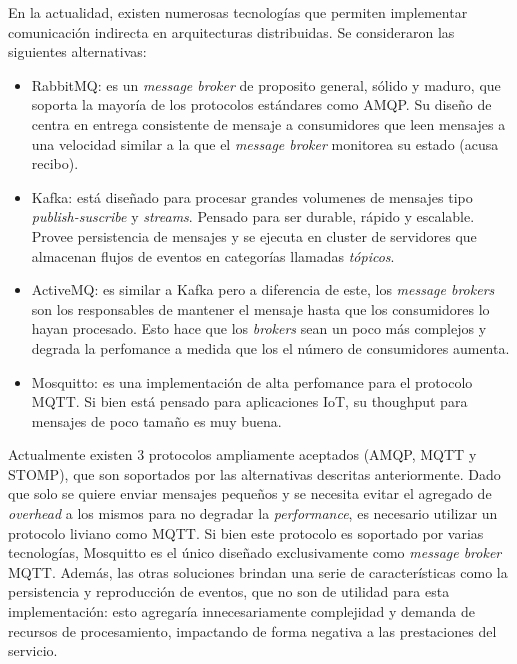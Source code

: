 \documentclass[a4paper,10pt, oneside]{article}
\begin{document}
En la actualidad, existen numerosas tecnologías que permiten implementar comunicación indirecta en arquitecturas distribuidas. Se consideraron las siguientes alternativas:

\begin{itemize}

	\item RabbitMQ: es un \textit{message broker} de proposito general, sólido y maduro, que soporta la mayoría de los protocolos estándares como AMQP. Su diseño de centra en entrega consistente de mensaje a consumidores que leen mensajes a una velocidad similar a la que el \textit{message broker} monitorea  su estado (acusa recibo).
	\item Kafka: está diseñado para procesar grandes volumenes de mensajes tipo \textit{publish-suscribe} y \textit{streams}. Pensado para ser durable, rápido y escalable. Provee persistencia de mensajes y se ejecuta en cluster de servidores que almacenan flujos de eventos en categorías llamadas \textit{tópicos}.
	\item ActiveMQ: es similar a Kafka pero a diferencia de este, los \textit{message brokers} son los responsables de mantener el mensaje hasta que los consumidores lo hayan procesado. Esto hace que los \textit{brokers} sean un poco más complejos y degrada la perfomance a medida que los el número de consumidores aumenta.
	\item Mosquitto: es una implementación de alta perfomance para el protocolo MQTT. Si bien está pensado para aplicaciones IoT, su thoughput para mensajes de poco tamaño es muy buena.

\end{itemize}

Actualmente existen 3 protocolos ampliamente aceptados (AMQP, MQTT y STOMP), que son soportados por las alternativas descritas anteriormente. Dado que solo se quiere enviar mensajes pequeños y se necesita evitar el agregado de \textit{overhead} a los mismos para no degradar la \textit{performance}, es necesario utilizar un protocolo liviano como MQTT. Si bien este protocolo es soportado por varias tecnologías, Mosquitto es el único diseñado exclusivamente como \textit{message broker} MQTT. Además, las otras soluciones brindan una serie de características como la persistencia y reproducción de eventos, que no son de utilidad para esta implementación: esto agregaría innecesariamente complejidad y demanda de recursos de procesamiento, impactando de forma negativa a las prestaciones del servicio.
\end{document}
